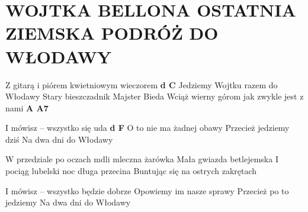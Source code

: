 \documentclass[../../../songbook.tex]{subfiles}
\begin{document}
\TabPositions{8cm} %
\section*{WOJTKA BELLONA OSTATNIA ZIEMSKA PODRÓŻ DO WŁODAWY}
{}
\vspace{0.5cm}

\setlength{\columnsep}{0.1cm}
\begin{multicols}{2}
{\footnotesize
Z gitarą i piórem kwietniowym wieczorem		 {\color{red}\textbf{d C} } \newline
Jedziemy Wojtku razem do Włodawy		\quad{} \newline
Stary bieszczadnik Majster Bieda		\quad\quad{} \newline
Wciąż wierny górom jak zwykle jest z nami	 {\color{red}\textbf{A A7} } \newline
	
\-\hspace{1cm} I mówisz – wszystko się uda	 {\color{red}\textbf{d F} } \newline
\-\hspace{1cm} O to nie ma żadnej obawy		 \newline
\-\hspace{1cm} Przecież jedziemy dziś		\quad{} \newline
\-\hspace{1cm} Na dwa dni do Włodawy		 \newline

W przedziale po oczach mdli mleczna żarówka				\newline
Mała gwiazda betlejemska				\newline
I pociąg lubelski noc długa przecina				\newline	
Buntując się na ostrych zakrętach				\newline

\-\hspace{1cm} I mówisz – wszystko będzie dobrze 			\newline
\-\hspace{1cm} Opowiemy im nasze sprawy 			\newline
\-\hspace{1cm} Przecież po to jedziemy 			\newline
\-\hspace{1cm} Na dwa dni do Włodawy 			\newline

}
\end{multicols}
\end{document}

